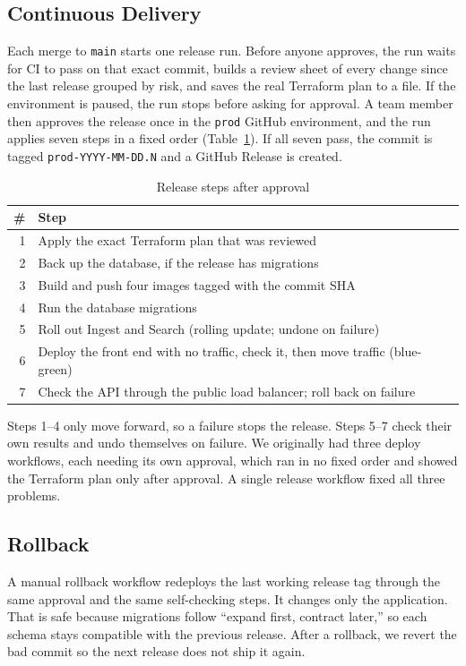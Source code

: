 \documentclass[conference]{IEEEtran}
\begin{document}
\subsection{Continuous Delivery}
Each merge to \texttt{main} starts one release run. Before anyone
approves, the run waits for CI to pass on that exact commit, builds a
review sheet of every change since the last release grouped by risk, and
saves the real Terraform plan to a file. If the environment is paused, the
run stops before asking for approval. A team member then approves the
release once in the \texttt{prod} GitHub environment, and the run applies
seven steps in a fixed order (Table~\ref{tab:release}). If all seven pass,
the commit is tagged \texttt{prod-YYYY-MM-DD.N} and a GitHub Release is
created.

\begin{table}[!t]
\caption{Release steps after approval}
\label{tab:release}
\centering\footnotesize
\begin{tabularx}{\columnwidth}{@{}rX@{}}
\toprule
\# & Step \\
\midrule
1 & Apply the exact Terraform plan that was reviewed \\
2 & Back up the database, if the release has migrations \\
3 & Build and push four images tagged with the commit SHA \\
4 & Run the database migrations \\
5 & Roll out Ingest and Search (rolling update; undone on failure) \\
6 & Deploy the front end with no traffic, check it, then move traffic (blue-green) \\
7 & Check the API through the public load balancer; roll back on failure \\
\bottomrule
\end{tabularx}
\end{table}

Steps 1--4 only move forward, so a failure stops the release. Steps 5--7
check their own results and undo themselves on failure. We originally had
three deploy workflows, each needing its own approval, which ran in no
fixed order and showed the Terraform plan only after approval. A single
release workflow fixed all three problems.

\subsection{Rollback}
A manual rollback workflow redeploys the last working release tag through
the same approval and the same self-checking steps. It changes only the
application. That is safe because migrations follow ``expand first,
contract later,'' so each schema stays compatible with the previous
release. After a rollback, we revert the bad commit so the next release
does not ship it again.
\end{document}

